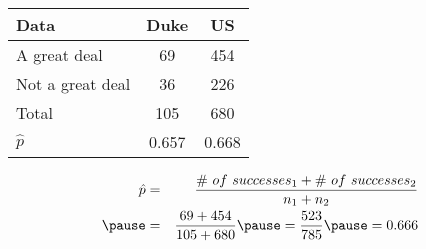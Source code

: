 \documentclass[slidestop,compress,mathserif]{beamer}
\newcommand{\soln}[1]{\textit{#1}}
\begin{document}

\begin{frame}
\frametitle{}


{\footnotesize
\begin{center}
\begin{tabular}{l | c c}
Data			& Duke		& US \\
\hline
A great deal	& 69			& 454 \\
Not a great deal& 36			& 226 \\
\hline
Total			& 105		& 680 \\
\hline
$\hat{p}$		& 0.657		& 0.668
\end{tabular}
\end{center}
}

\pause

\soln{
\begin{eqnarray*}
\hat{p} &=& \frac{\#~of~successes_1 + \#~of~successes_2}{n_1 + n_2} \\
\pause
&=& \frac{69+454}{105+680} \pause = \frac{523}{785} \pause = 0.666
\end{eqnarray*}
}

\end{frame}
\end{document}
